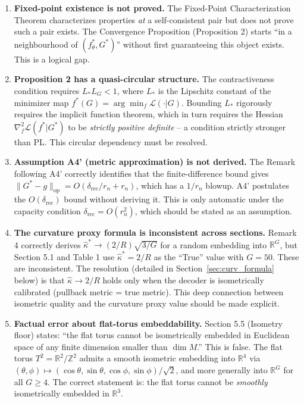 \documentclass[11pt]{article}
\newcommand{\R}{\mathbb{R}}
\newcommand{\Z}{\mathbb{Z}}
\begin{document}
\begin{enumerate}
\item \textbf{Fixed-point existence is not proved.}
The Fixed-Point Characterization Theorem characterizes properties \emph{at} a
self-consistent pair but does not prove such a pair exists. The Convergence
Proposition (Proposition 2) starts ``in a neighbourhood of $(f_\theta^*, G^*)$''
without first guaranteeing this object exists. This is a logical gap.

\item \textbf{Proposition 2 has a quasi-circular structure.}
The contractiveness condition requires $L_* L_G < 1$, where $L_*$ is the
Lipschitz constant of the minimizer map $f^*(G) = \arg\min_f \mathcal{L}(\cdot |
G)$. Bounding $L_*$ rigorously requires the implicit function theorem, which in
turn requires the Hessian $\nabla^2_{f}\mathcal{L}(f^*|G^*)$ to be
\emph{strictly positive definite} -- a condition strictly stronger than PL. This
circular dependency must be resolved.

\item \textbf{Assumption A4' (metric approximation) is not derived.}
The Remark following A4' correctly identifies that the finite-difference bound
gives $\|G^* - g\|_{\mathrm{op}} = O(\delta_{\mathrm{rec}}/r_n + r_n)$, which
has a $1/r_n$ blowup. A4' postulates the $O(\delta_{\mathrm{rec}})$ bound
without deriving it. This is only automatic under the capacity condition
$\delta_{\mathrm{rec}} = O(r_n^2)$, which should be stated as an assumption.

\item \textbf{The curvature proxy formula is inconsistent across sections.}
Remark 4 correctly derives $\hat{\kappa}^* \to (2/R)\sqrt{3/G}$ for a random
embedding into $\R^G$, but Section 5.1 and Table 1 use $\hat{\kappa}^* = 2/R$
as the ``True'' value with $G = 50$. These are inconsistent. The resolution
(detailed in Section~\ref{sec:curv_formula} below) is that $\hat{\kappa} \to 2/R$
holds only when the decoder is isometrically calibrated (pullback metric =
true metric). This deep connection between isometric quality and the curvature
proxy value should be made explicit.

\item \textbf{Factual error about flat-torus embeddability.}
Section 5.5 (Isometry floor) states: ``the flat torus cannot be isometrically
embedded in Euclidean space of any finite dimension smaller than $\dim M$.''
This is false. The flat torus $T^2 = \R^2/\Z^2$ admits a smooth isometric
embedding into $\R^4$ via $(\theta, \phi) \mapsto (\cos\theta, \sin\theta,
\cos\phi, \sin\phi)/\sqrt{2}$, and more generally into $\R^G$ for all $G \ge 4$.
The correct statement is: the flat torus cannot be \emph{smoothly} isometrically
embedded in $\R^3$.


\end{enumerate}
\end{document}
